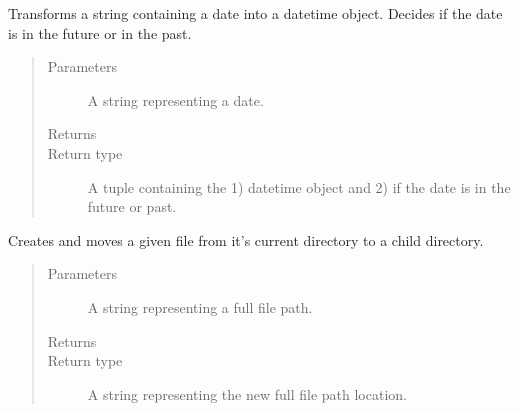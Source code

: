 \documentclass[letterpaper,10pt,english]{sphinxmanual}
\begin{document}
\begin{fulllineitems}
\label{\detokenize{index:ListManagement.utility.general.convert_unicode_to_date}}
Transforms a string containing a date into a datetime object. Decides if
the date is in the future or in the past.
\begin{quote}\begin{description}
\item[{Parameters}] \leavevmode
{} \textendash{} A string representing a date.

\item[{Returns}] \leavevmode


\item[{Return type}] \leavevmode
A tuple containing the 1) datetime object and 2) if the date is in the future or past.

\end{description}\end{quote}

\end{fulllineitems}


\begin{fulllineitems}
\label{\detokenize{index:ListManagement.utility.general.create_dir_move_file}}
Creates and moves a given file from it’s current directory to a child directory.
\begin{quote}\begin{description}
\item[{Parameters}] \leavevmode
{} \textendash{} A string representing a full file path.

\item[{Returns}] \leavevmode


\item[{Return type}] \leavevmode
A string representing the new full file path location.

\end{description}\end{quote}

\end{fulllineitems}
\end{document}
